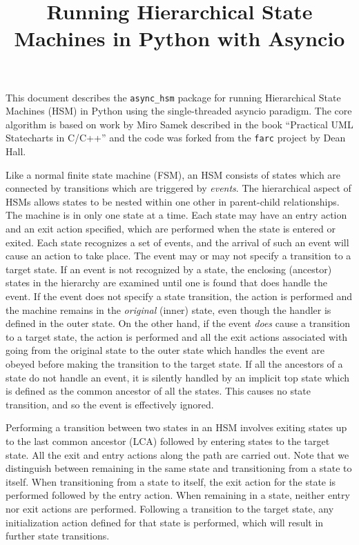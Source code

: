 \documentclass[12pt]{article}
\title{\textbf{Running Hierarchical State Machines in Python with Asyncio}}
\author{}
\date{}
\begin{document}
\maketitle
This document describes the \texttt{async\_hsm} package for running Hierarchical State Machines (HSM) in Python using the single-threaded asyncio paradigm. The core algorithm is based on work by Miro Samek described in the book ``Practical UML Statecharts in C/C++'' and the code was forked from the \texttt{farc} project by Dean Hall.

Like a normal finite state machine (FSM), an HSM consists of states which are connected by transitions which are triggered by \emph{events}. The hierarchical aspect of HSMs allows states to be nested within one other in parent-child relationships. The machine is in only one state at a time. Each state may have an entry action and an exit action specified, which are performed when the state is entered or exited. Each state recognizes a set of events, and the arrival of such an event will cause an action to take place. The event may or may not specify a transition to a target state. If an event is not recognized by a state, the enclosing (ancestor) states in the hierarchy are examined until one is found that does handle the event. If the event does not specify a state transition, the action is performed and the machine remains in the \emph{original} (inner) state, even though the handler is defined in the outer state. On the other hand, if the event \emph{does} cause a transition to a target state, the action is performed
and all the exit actions associated with going from the original state to the outer state which handles the event are obeyed before making the transition to the target state. If all the ancestors of a state do not handle an event, it is silently handled by an implicit top state which is defined as the common ancestor of all the states. This causes no state transition, and so the event is effectively ignored. 

Performing a transition between two states in an HSM involves exiting states up to the last common ancestor (LCA) followed by entering states to the target state. All the exit and entry actions along the path are carried out. Note that we distinguish between remaining in the same state and transitioning from a state to itself. When transitioning from a state to itself, the exit action for the state is performed followed by the entry action. When remaining in a state, neither entry nor exit actions are performed. Following a transition to the target state, any initialization action defined for that state is performed, which will result in further state transitions.
\end{document}
